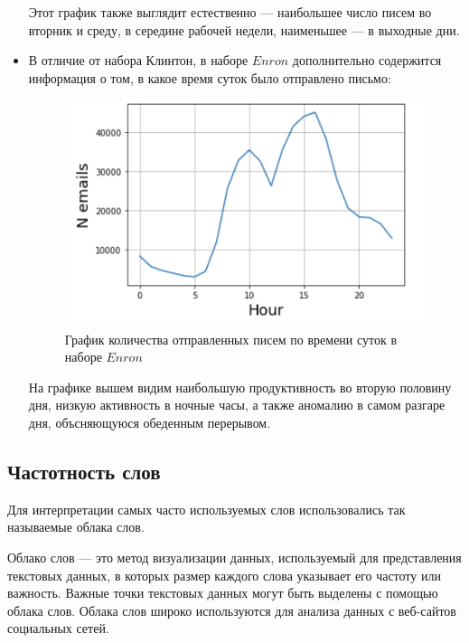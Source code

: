 \begin{itemize}
Этот график также выглядит естественно --- наибольшее число писем во вторник и среду, в середине рабочей недели, наименьшее --- в выходные дни.

\item В отличие от набора Клинтон, в наборе $Enron$ дополнительно содержится информация о том,
в какое время суток было отправлено письмо:


\begin{figure}[H]
\centering
\includegraphics[scale=0.7]{pics/enron_hour.png}
\caption{График количества отправленных писем по времени суток в наборе $Enron$}
\end{figure}

На графике вышем видим наибольшую продуктивность во вторую половину дня, низкую активность в ночные часы, а также аномалию в самом разгаре дня, объсняющуюся обеденным перерывом.

\end{itemize}

\subsection{Частотность слов}

Для интерпретации самых часто используемых слов использовались так называемые облака слов.

Облако слов --- это метод визуализации данных, используемый для представления текстовых данных, в которых размер каждого слова указывает его частоту или важность. Важные точки текстовых данных могут быть выделены с помощью облака слов. Облака слов широко используются для анализа данных с веб-сайтов социальных сетей.


